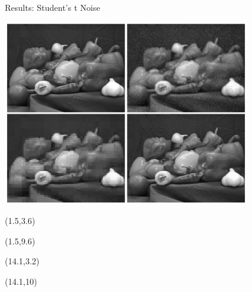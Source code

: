 \documentclass[12pt]{beamer}
\begin{document}
\begin{frame}{Results: Student's t Noise}
\begin{center}
\vspace{-3 mm}
\includegraphics[width = 0.8\textwidth]{../figures/wavStudent_2.pdf} 
\end{center}

\begin{textblock}{5}(1.5,3.6)
\end{textblock}

\begin{textblock}{5}(1.5,9.6)
\end{textblock}

\begin{textblock}{5}(14.1,3.2)
\end{textblock}

\begin{textblock}{5}(14.1,10)
\end{textblock}
\end{frame}
\end{document}
